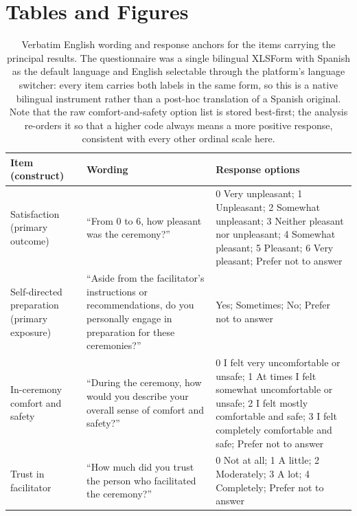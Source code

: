 \documentclass[12pt]{article}
\begin{document}


\clearpage

\section*{Tables and Figures}

\begin{table}[htbp]
\centering
\small
{}
\caption{Verbatim English wording and response anchors for the items carrying the principal results. The
questionnaire was a single bilingual XLSForm with Spanish as the default language and English selectable
through the platform's language switcher: every item carries both labels in the same form, so this is a
native bilingual instrument rather than a post-hoc translation of a Spanish original. Note that the raw
comfort-and-safety option list is stored best-first; the analysis re-orders it so that a higher code always
means a more positive response, consistent with every other ordinal scale here.}
\label{tab:items}
\vspace{0.8em}  %
\begin{tabular}{p{3cm}p{5.6cm}p{5.4cm}}
\toprule
Item (construct) & Wording & Response options \\
\midrule
Satisfaction \newline (primary outcome) &
``From 0 to 6, how pleasant was the ceremony?'' &
0 Very unpleasant; 1 Unpleasant; 2 Somewhat unpleasant; 3 Neither pleasant nor unpleasant; 4 Somewhat
pleasant; 5 Pleasant; 6 Very pleasant; Prefer not to answer \\
\addlinespace
Self-directed preparation \newline (primary exposure) &
``Aside from the facilitator's instructions or recommendations, do you personally engage in preparation for
these ceremonies?'' &
Yes; Sometimes; No; Prefer not to answer \\
\addlinespace
In-ceremony comfort and safety &
``During the ceremony, how would you describe your overall sense of comfort and safety?'' &
0 I felt very uncomfortable or unsafe; 1 At times I felt somewhat uncomfortable or unsafe; 2 I felt mostly
comfortable and safe; 3 I felt completely comfortable and safe; Prefer not to answer \\
\addlinespace
Trust in facilitator &
``How much did you trust the person who facilitated the ceremony?'' &
0 Not at all; 1 A little; 2 Moderately; 3 A lot; 4 Completely; Prefer not to answer \\

\end{tabular}
\end{table}
\end{document}
